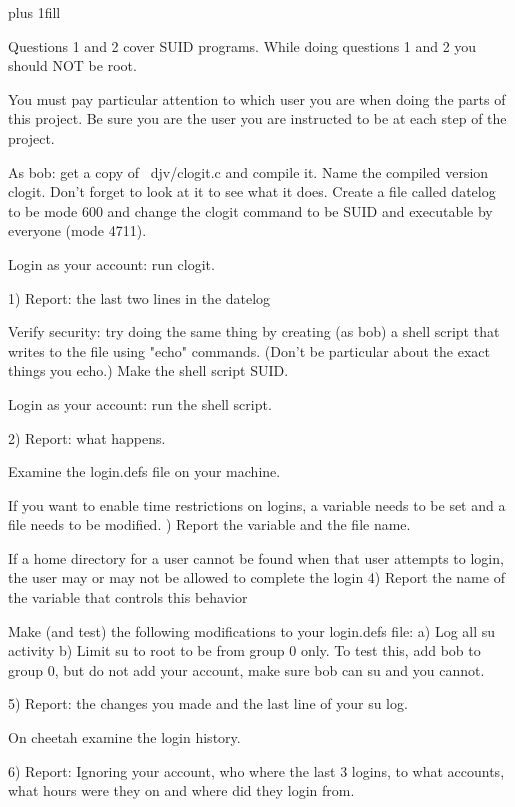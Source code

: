 
\rightskip=0pt plus 1fill

\parindent 0pt

Questions 1 and 2 cover SUID programs.
While doing questions 1 and 2 you should NOT be root.

You must pay particular attention to which user you are when
doing the parts of this project. Be sure you are the user
you are instructed to be at each step of the project.

As bob: get a copy of {\ltt{}~djv/clogit.c} and compile it.
Name the compiled version {\ltt{}clogit}.
Don't forget to look at it to see what it does.
Create a file called {\ltt{}datelog} to be mode 600 and
change the {\ltt{}clogit} command to be SUID and executable
by everyone (mode 4711).

Login as your account: run clogit.

1) Report: the last two lines in the datelog

Verify security: try doing the same thing by creating (as bob) a shell
script that writes to the file using "echo" commands.
(Don't be particular about the exact things you echo.)
Make the shell script SUID.

Login as your account: run the shell script.

2) Report: what happens.

Examine the {\ltt{}login.defs} file on your machine.

If you want to enable time restrictions on logins, a
variable needs to be set and a file needs to be modified.
\hfill{}) Report the variable and the file name.

If a home directory for a user cannot be found when that user attempts to
login, the user may or may not be allowed to complete the login
4) Report the name of the variable that controls this behavior

Make (and test) the following modifications to your {\ltt{}login.defs} file:
\hfill\break
a) Log all su activity
\hfill\break
b) Limit {\ltt{}su} to {\ltt{}root} to be from group 0 only.
To test this, add {\ltt{}bob} to group 0, but do not add your account,
make sure {\ltt{}bob} can su and you cannot.

5) Report: the changes you made and the last line of your su log.

On {\ltt{}cheetah} examine the login history.

6) Report: Ignoring your account, who where the last 3 logins, to what
accounts, what hours were they on and where did they login from.
\bye
